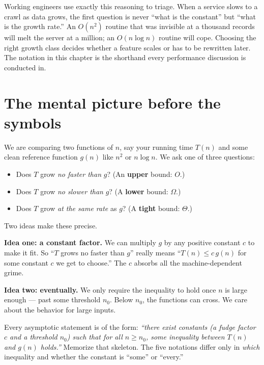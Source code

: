 \begin{aestheticbox}
Working engineers use exactly this reasoning to triage. When a
service slows to a crawl as data grows, the first question is never ``what is the
constant'' but ``what is the growth rate.'' An $O(n^2)$ routine that was invisible
at a thousand records will melt the server at a million; an $O(n\log n)$ routine
will cope. Choosing the right growth class decides whether a feature scales or
has to be rewritten later. The notation in this chapter
is the shorthand every performance discussion is conducted in.
\end{aestheticbox}

\section{The mental picture before the symbols}

We are comparing two functions of $n$,
say your running time $T(n)$ and some clean reference function $g(n)$ like $n^2$ or
$n\log n$. We ask one of three questions:

\begin{itemize}
  \item Does $T$ grow \emph{no faster than} $g$? (An \textbf{upper} bound: $O$.)
  \item Does $T$ grow \emph{no slower than} $g$? (A \textbf{lower} bound: $\Omega$.)
  \item Does $T$ grow \emph{at the same rate} as $g$? (A \textbf{tight} bound: $\Theta$.)
\end{itemize}

Two ideas make these precise.

\textbf{Idea one: a constant factor.} We can multiply $g$ by any positive constant $c$ to make it fit. So
``$T$ grows no faster than $g$'' really means ``$T(n) \le c\,g(n)$ for some constant
$c$ we get to choose.'' The $c$ absorbs all the machine-dependent grime.

\textbf{Idea two: eventually.} We only require the inequality to hold once $n$ is large enough --- past some threshold $n_0$. Below $n_0$, the functions can cross. We care about the behavior for large inputs.

\begin{focusbox}
Every asymptotic statement is of the form: \emph{``there exist constants (a fudge
factor $c$ and a threshold $n_0$) such that for all $n \ge n_0$, some inequality
between $T(n)$ and $g(n)$ holds.''} Memorize that skeleton. The five notations
differ only in \emph{which} inequality and whether the constant is ``some'' or
``every.''
\end{focusbox}

